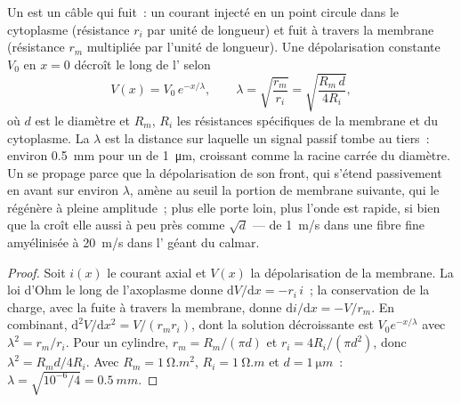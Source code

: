 \begin{theorem}\label{thm:b2:neurons-synapses:cable}
Un  est un câble qui fuit~: un courant injecté en un point circule
dans le cytoplasme (résistance $r_i$ par unité de longueur) et fuit à
travers la membrane (résistance $r_m$ multipliée par l'unité de
longueur). Une dépolarisation constante $V_0$ en $x = 0$ décroît le long
de l' selon
\[
V(x) = V_0\,e^{-x/\lambda}, \qquad \lambda = \sqrt{\frac{r_m}{r_i}} = \sqrt{\frac{R_m\,d}{4R_i}},
\]
où $d$ est le diamètre et $R_m$, $R_i$ les résistances spécifiques de la
membrane et du cytoplasme. La \emph{}
$\lambda$ est la distance sur laquelle un signal passif tombe au
tiers~: environ \qty{0.5}{mm} pour un  de \qty{1}{\micro m},
croissant comme la racine carrée du diamètre. Un  se
propage parce que la dépolarisation de son front, qui s'étend
passivement en avant sur environ $\lambda$, amène au seuil la portion
de membrane suivante, qui le régénère à pleine amplitude~; plus elle
porte loin, plus l'onde est rapide, si bien que la 
croît elle aussi à peu près comme $\sqrt{d}$ --- de \qty{1}{m/s} dans une
fibre fine amyélinisée à \qty{20}{m/s} dans l' géant du calmar.
\end{theorem}
\begin{proof}
Soit $i(x)$ le courant axial et $V(x)$ la dépolarisation de la
membrane. La loi d'Ohm le long de l'axoplasme donne $\mathrm{d}V/
\mathrm{d}x = -r_i\,i$~; la conservation de la charge, avec la fuite à
travers la membrane, donne $\mathrm{d}i/\mathrm{d}x = -V/r_m$. En
combinant, $\mathrm{d}^{2}V/\mathrm{d}x^{2} = V/(r_m r_i)$, dont la
solution décroissante est $V_0 e^{-x/\lambda}$ avec $\lambda^{2} = r_m/r_i$. Pour un
cylindre, $r_m = R_m/(\pi d)$ et $r_i = 4R_i/(\pi d^{2})$, donc
$\lambda^{2} = R_m d/4R_i$. Avec $R_m = \qty{1}{\ohm.m^2}$, $R_i =
\qty{1}{\ohm.m}$ et $d = \qty{1}{\micro m}$~: $\lambda = \sqrt{10^{-6}
/4} = \qty{0.5}{mm}$.
\end{proof}

